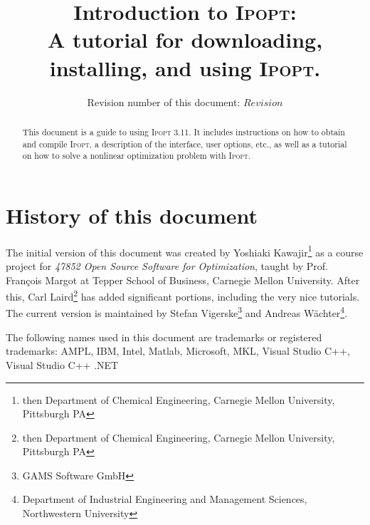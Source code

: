 \documentclass[10pt]{article}
\newcommand{\Ipopt}{\textsc{Ipopt}\xspace}
\begin{document}
\title{Introduction to \Ipopt:\\
A tutorial for downloading, installing, and using \Ipopt.}

\author{Revision number of this document: $Revision$}

\maketitle

\begin{abstract}
  This document is a guide to using \Ipopt 3.11.  It includes
  instructions on how to obtain and compile \Ipopt, a description of
  the interface, user options, etc., as well as a tutorial on how to
  solve a nonlinear optimization problem with \Ipopt.
\end{abstract}

\section*{History of this document}
The initial version of this document was created by Yoshiaki
Kawajir\footnote{then Department of Chemical Engineering, Carnegie Mellon
  University, Pittsburgh PA} as a course project for \textit{47852
  Open Source Software for Optimization}, taught by Prof. Fran\c{c}ois
Margot at Tepper School of Business, Carnegie Mellon University.
After this, Carl Laird\footnote{then Department of Chemical
  Engineering, Carnegie Mellon University, Pittsburgh PA} has added
significant portions, including the very nice tutorials.  The current
version is maintained by Stefan Vigerske\footnote{GAMS Software GmbH} and
  Andreas W\"achter\footnote{Department of Industrial Engineering and
  Management Sciences, Northwestern University}.

\tableofcontents

\vspace{\baselineskip}
\begin{small}
\noindent
The following names used in this document are trademarks or registered
trademarks: AMPL, IBM, Intel, Matlab, Microsoft, MKL, Visual Studio C++,
Visual Studio C++ .NET
\end{small}
\end{document}
